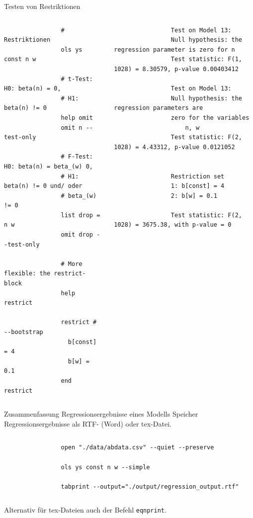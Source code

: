 \documentclass{beamer}[11pt]
\begin{document}
\begin{frame}[fragile]{Testen von Restriktionen}
	\begin{columns}[T] %
		\scriptsize
		\begin{column}{.5\textwidth}
			\begin{verbatim}
				# Restriktionen
				ols ys const n w

				# t-Test: H0: beta(n) = 0,
				# H1: beta(n) != 0
				help omit
				omit n --test-only

				# F-Test: H0: beta(n) = beta_(w) 0,
				# H1: beta(n) != 0 und/ oder
				# beta_(w) != 0
				list drop = n w
				omit drop --test-only

				# More flexible: the restrict-block
				help restrict

				restrict # --bootstrap
			      b[const] = 4
				  b[w] = 0.1
				end restrict
			\end{verbatim}
		\end{column}

		\begin{column}{.53\textwidth}
			\tiny
			\begin{verbatim}
				Test on Model 13:
				Null hypothesis: the regression parameter is zero for n
				Test statistic: F(1, 1028) = 8.30579, p-value 0.00403412

				Test on Model 13:
				Null hypothesis: the regression parameters are
				zero for the variables
					n, w
				Test statistic: F(2, 1028) = 4.43312, p-value 0.0121052


				Restriction set
				1: b[const] = 4
				2: b[w] = 0.1

				Test statistic: F(2, 1028) = 3675.38, with p-value = 0
			\end{verbatim}
	  \end{column}
	\end{columns}
\end{frame}


\begin{frame}[fragile]{Zusammenfassung Regressionsergebnisse eines Modells}
	Speicher Regressionsergebnisse als RTF- (Word) oder tex-Datei.
	\begin{columns}[T] %
		\scriptsize
		\begin{column}{.5\textwidth}
			\begin{verbatim}
				open "./data/abdata.csv" --quiet --preserve

				ols ys const n w --simple

				tabprint --output="./output/regression_output.rtf"
			\end{verbatim}
		\end{column}

		\begin{column}{.53\textwidth}
			\tiny
			\begin{verbatim}

			\end{verbatim}
	  \end{column}
	\end{columns}

	\vspace{0.5cm}
	Alternativ für tex-Dateien auch der Befehl \texttt{eqnprint}.
\end{frame}
\end{document}
